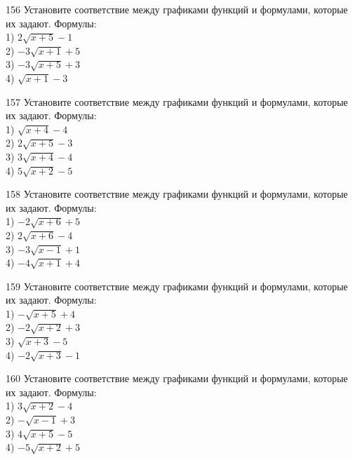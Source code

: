\documentclass[4apaper]{article}
\begin{document}
\begin{taskBN}{156}
Установите соответствие между графиками функций и формулами, которые их задают. Формулы: \\1) $2\sqrt{x+5}-1$\\2) $-3\sqrt{x+1}+5$\\3) $-3\sqrt{x+5}+3$\\4) $\sqrt{x+1}-3$
\end{taskBN}

\begin{taskBN}{157}
Установите соответствие между графиками функций и формулами, которые их задают. Формулы: \\1) $\sqrt{x+4}-4$\\2) $2\sqrt{x+5}-3$\\3) $3\sqrt{x+4}-4$\\4) $5\sqrt{x+2}-5$
\end{taskBN}

\begin{taskBN}{158}
Установите соответствие между графиками функций и формулами, которые их задают. Формулы: \\1) $-2\sqrt{x+6}+5$\\2) $2\sqrt{x+6}-4$\\3) $-3\sqrt{x-1}+1$\\4) $-4\sqrt{x+1}+4$
\end{taskBN}

\begin{taskBN}{159}
Установите соответствие между графиками функций и формулами, которые их задают. Формулы: \\1) $-\sqrt{x+5}+4$\\2) $-2\sqrt{x+2}+3$\\3) $\sqrt{x+3}-5$\\4) $-2\sqrt{x+3}-1$
\end{taskBN}

\begin{taskBN}{160}
Установите соответствие между графиками функций и формулами, которые их задают. Формулы: \\1) $3\sqrt{x+2}-4$\\2) $-\sqrt{x-1}+3$\\3) $4\sqrt{x+5}-5$\\4) $-5\sqrt{x+2}+5$
\end{taskBN}
\end{document}
